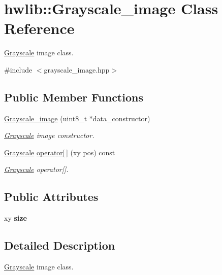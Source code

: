 \hypertarget{classhwlib_1_1Grayscale__image}{}\section{hwlib\+:\+:Grayscale\+\_\+image Class Reference}
\label{classhwlib_1_1Grayscale__image}


\hyperlink{classhwlib_1_1Grayscale}{Grayscale} image class.  




{\ttfamily \#include $<$grayscale\+\_\+image.\+hpp$>$}

\subsection*{Public Member Functions}
\begin{DoxyCompactItemize}
\item 
\hyperlink{classhwlib_1_1Grayscale__image_a852771dc5a7ea93f9420f6d5b0e9262a}{Grayscale\+\_\+image} (uint8\+\_\+t $\ast$data\+\_\+constructor)
\begin{DoxyCompactList}\small\item\em \hyperlink{classhwlib_1_1Grayscale}{Grayscale} image constructor. \end{DoxyCompactList}\item 
\hyperlink{classhwlib_1_1Grayscale}{Grayscale} \hyperlink{classhwlib_1_1Grayscale__image_a57639aedc8bd30a417d51b7a2d01bcf3}{operator\mbox{[}$\,$\mbox{]}} (xy pos) const
\begin{DoxyCompactList}\small\item\em \hyperlink{classhwlib_1_1Grayscale}{Grayscale} operator\mbox{[}\mbox{]}. \end{DoxyCompactList}\end{DoxyCompactItemize}
\subsection*{Public Attributes}
\begin{DoxyCompactItemize}
\item 
\mbox{\label{classhwlib_1_1Grayscale__image_a005fc37b3f5b55d8895e2cbb503a55f2}} 
xy {\bfseries size}
\end{DoxyCompactItemize}


\subsection{Detailed Description}
\hyperlink{classhwlib_1_1Grayscale}{Grayscale} image class. 

